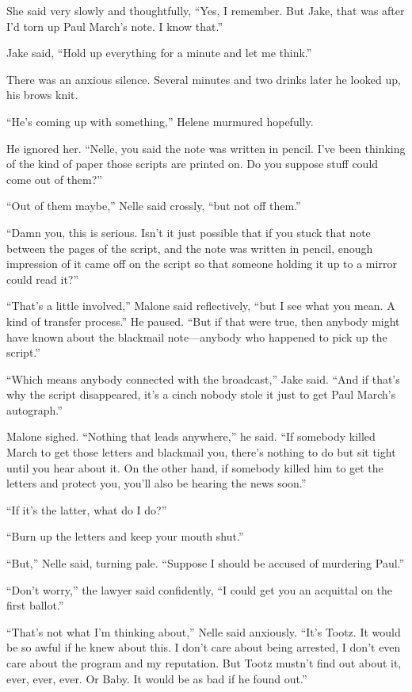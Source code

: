 \documentclass{novel}
\begin{document}
She said very slowly and thoughtfully, “Yes, I remember. But Jake, that was after I’d torn up Paul March’s note. I know that.”

Jake said, “Hold up everything for a minute and let me think.”

There was an anxious silence. Several minutes and two drinks later he looked up, his brows knit.

“He’s coming up with something,” Helene murmured hopefully.

He ignored her. “Nelle, you said the note was written in pencil. I’ve been thinking of the kind of paper those scripts are printed on. Do you suppose stuff could come out of them?”

“Out of them maybe,” Nelle said crossly, “but not off them.”

“Damn you, this is serious. Isn’t it just possible that if you stuck that note between the pages of the script, and the note was written in pencil, enough impression of it came off on the script so that someone holding it up to a mirror could read it?”

“That’s a little involved,” Malone said reflectively, “but I see what you mean. A kind of transfer process.” He paused. “But if that were true, then anybody might have known about the blackmail note—anybody who happened to pick up the script.”

“Which means anybody connected with the broadcast,” Jake said. “And if that’s why the script disappeared, it’s a cinch nobody stole it just to get Paul March’s autograph.”

Malone sighed. “Nothing that leads anywhere,” he said. “If somebody killed March to get those letters and blackmail you, there’s nothing to do but sit tight until you hear about it. On the other hand, if somebody killed him to get the letters and protect you, you’ll also be hearing the news soon.”

“If it’s the latter, what do I do?”

“Burn up the letters and keep your mouth shut.”

“But,” Nelle said, turning pale. “Suppose I should be accused of murdering Paul.”

“Don’t worry,” the lawyer said confidently, “I could get you an acquittal on the first ballot.”

“That’s not what I’m thinking about,” Nelle said anxiously. “It’s Tootz. It would be so awful if he knew about this. I don’t care about being arrested, I don’t even care about the program and my reputation. But Tootz mustn’t find out about it, ever, ever, ever. Or Baby. It would be as bad if he found out.”
\end{document}
